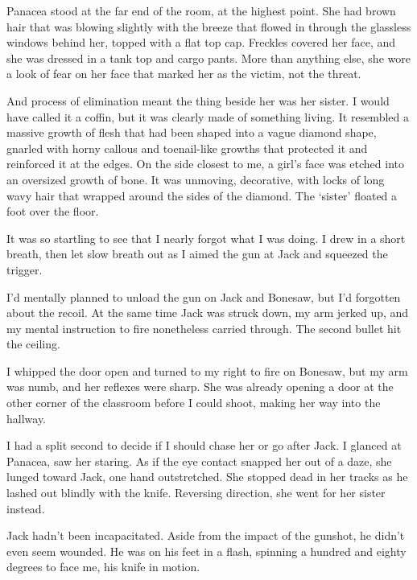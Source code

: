 Panacea stood at the far end of the room, at the highest point. She had brown hair that was blowing slightly with the breeze that flowed in through the glassless windows behind her, topped with a flat top cap.  Freckles covered her face, and she was dressed in a tank top and cargo pants.  More than anything else, she wore a look of fear on her face that marked her as the victim, not the threat.



And process of elimination meant the thing beside her was her sister.  I would have called it a coffin, but it was clearly made of something living.  It resembled a massive growth of flesh that had been shaped into a vague diamond shape, gnarled with horny callous and toenail-like growths that protected it and reinforced it at the edges.  On the side closest to me, a girl's face was etched into an oversized growth of bone.  It was unmoving, decorative, with locks of long wavy hair that wrapped around the sides of the diamond.  The `sister' floated a foot over the floor.



It was so startling to see that I nearly forgot what I was doing.  I drew in a short breath, then let slow breath out as I aimed the gun at Jack and squeezed the trigger.



I'd mentally planned to unload the gun on Jack and Bonesaw, but I'd forgotten about the recoil.   At the same time Jack was struck down, my arm jerked up, and my mental instruction to fire nonetheless carried through.  The second bullet hit the ceiling.



I whipped the door open and turned to my right to fire on Bonesaw, but my arm was numb, and her reflexes were sharp.  She was already opening a door at the other corner of the classroom before I could shoot, making her way into the hallway.



I had a split second to decide if I should chase her or go after Jack.  I glanced at Panacea, saw her staring.  As if the eye contact snapped her out of a daze, she lunged toward Jack, one hand outstretched.  She stopped dead in her tracks as he lashed out blindly with the knife.  Reversing direction, she went for her sister instead.



Jack hadn't been incapacitated.  Aside from the impact of the gunshot, he didn't even seem wounded.  He was on his feet in a flash, spinning a hundred and eighty degrees to face me, his knife in motion.



